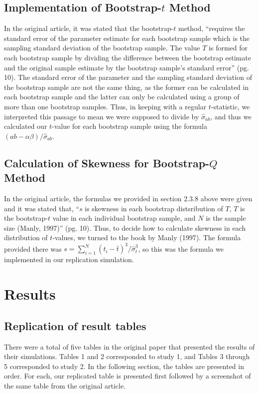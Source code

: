 \documentclass[10,a4paperpaper,]{article}
\begin{document}
\subsection{Implementation of Bootstrap-$t$ Method}

In the original article, it was stated that the bootstrap-\(t\) method,
``requires the standard error of the parameter estimate for each
bootstrap sample which is the sampling standard deviation of the
bootstrap sample. The value \(T\) is formed for each bootstrap sample by
dividing the difference between the bootstrap estimate and the original
sample estimate by the bootstrap sample's standard error'' (pg. 10). The
standard error of the parameter and the sampling standard deviation of
the bootstrap sample are not the same thing, as the former can be
calculated in each bootstrap sample and the latter can only be
calculated using a group of more than one bootstrap samples. Thus, in
keeping with a regular \(t\)-statistic, we interpreted this passage to
mean we were supposed to divide by \(\hat{\sigma}_{ab}\), and thus we
calculated our \(t\)-value for each bootstrap sample using the formula
\((ab - \alpha \beta)/\hat{\sigma}_{ab}\).

\subsection{Calculation of Skewness for Bootstrap-$Q$ Method}

In the original article, the formulas we provided in section 2.3.8 above
were given and it was stated that, ``\(s\) is skewness in each bootstrap
distsribution of \(T\), \(T\) is the bootstrap-\(t\) value in each
individual bootstrap sample, and \(N\) is the sample size (Manly,
1997)'' (pg. 10). Thus, to decide how to calculate skewness in each
distribution of \(t\)-values, we turned to the book by Manly (1997). The
formula provided there was
\(s = \sum_{i=1}^N (t_i - \bar t)^3/\hat \sigma_t^3\), so this was the
formula we implemented in our replication simulation.

\section{Results}

\subsection{Replication of result tables}

There were a total of five tables in the original paper that presented
the results of their simulations. Tables 1 and 2 corresponded to study
1, and Tables 3 through 5 corresponded to study 2. In the following
section, the tables are presented in order. For each, our replicated
table is presented first followed by a screenshot of the same table from
the original article.
\end{document}
